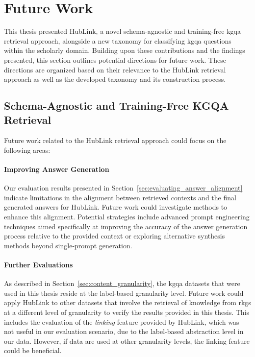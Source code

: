 
\section{Future Work}
\label{sec:future_work}

This thesis presented HubLink, a novel schema-agnostic and training-free \gls{kgqa} retrieval approach, alongside a new taxonomy for classifying \gls{kgqa} questions within the scholarly domain. Building upon these contributions and the findings presented, this section outlines potential directions for future work. These directions are organized based on their relevance to the HubLink retrieval approach as well as the developed taxonomy and its construction process.

\subsection{Schema-Agnostic and Training-Free KGQA Retrieval}

Future work related to the HubLink retrieval approach could focus on the following areas:

\paragraph{Improving Answer Generation} Our evaluation results presented in Section~\ref{sec:evaluating_answer_alignment} indicate limitations in the alignment between retrieved contexts and the final generated answers for HubLink. Future work could investigate methods to enhance this alignment. Potential strategies include advanced prompt engineering techniques aimed specifically at improving the accuracy of the answer generation process relative to the provided context or exploring alternative synthesis methods beyond single-prompt generation. 

\paragraph{Further Evaluations} As described in Section~\ref{sec:content_granularity}, the \gls{kgqa} datasets that were used in this thesis reside at the label-based granularity level. Future work could apply HubLink to other datasets that involve the retrieval of knowledge from \glspl{rkg} at a different level of granularity to verify the results provided in this thesis. This includes the evaluation of the \emph{linking} feature provided by HubLink, which was not useful in our evaluation scenario, due to the label-based abstraction level in our data. However, if data are used at other granularity levels, the linking feature could be beneficial.


